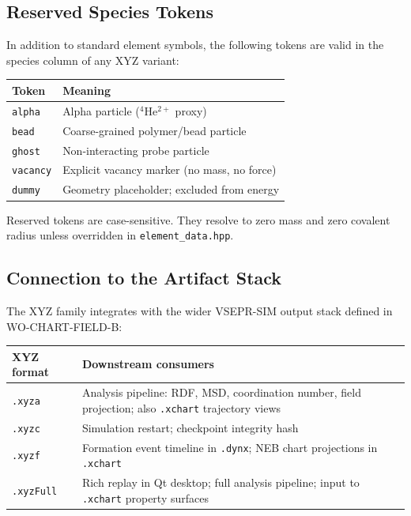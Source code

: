 \documentclass[11pt, a4paper, oneside]{article}
\begin{document}
\subsection{Reserved Species Tokens}
\label{sec:reserved_tokens}

In addition to standard element symbols, the following tokens are valid
in the species column of any XYZ variant:

\begin{center}
\begin{tabular}{ll}
  \toprule
  Token & Meaning \\
  \midrule
  \texttt{alpha}   & Alpha particle ($^4$He$^{2+}$ proxy) \\
  \texttt{bead}    & Coarse-grained polymer/bead particle \\
  \texttt{ghost}   & Non-interacting probe particle \\
  \texttt{vacancy} & Explicit vacancy marker (no mass, no force) \\
  \texttt{dummy}   & Geometry placeholder; excluded from energy \\
  \bottomrule
\end{tabular}
\end{center}

Reserved tokens are case-sensitive. They resolve to zero mass and zero
covalent radius unless overridden in \texttt{element\_data.hpp}.

\subsection{Connection to the Artifact Stack}
\label{sec:artifact_stack}

The XYZ family integrates with the wider VSEPR-SIM output stack defined
in WO-CHART-FIELD-B:

\begin{center}
\begin{tabular}{lp{8cm}}
  \toprule
  XYZ format & Downstream consumers \\
  \midrule
  \texttt{.xyza}    & Analysis pipeline: RDF, MSD, coordination number,
                       field projection; also \texttt{.xchart} trajectory views \\
  \texttt{.xyzc}    & Simulation restart; checkpoint integrity hash \\
  \texttt{.xyzf}    & Formation event timeline in \texttt{.dynx};
                       NEB chart projections in \texttt{.xchart} \\
  \texttt{.xyzFull} & Rich replay in Qt desktop; full analysis pipeline;
                       input to \texttt{.xchart} property surfaces \\
  \bottomrule
\end{tabular}
\end{center}
\end{document}
